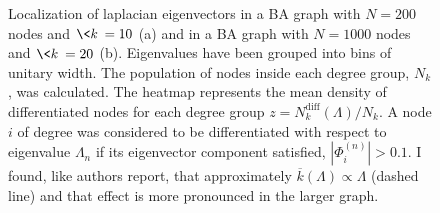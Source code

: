 \begin{figure}[H]
    \centering
{}
\caption{Localization of laplacian eigenvectors in a BA graph with $N=200$ nodes and $\<k\>=10$ (a) and in a BA graph with $N=1000$ nodes and $\<k\>=20$ (b). Eigenvalues have been grouped into bins of unitary width. The population of nodes inside each degree group, $N_k$, was calculated. The heatmap represents the mean density of differentiated nodes for each degree group $z = N_k^{\text{diff}}(\Lambda)/N_k$. A node $i$ of degree was considered to be differentiated with respect to eigenvalue $\Lambda_n$ if its eigenvector component satisfied, $|\Phi_i^{(n)}|> 0.1$. I found, like authors \cite{main_network} report, that approximately $\overline{k}(\Lambda) \propto \Lambda$ (dashed line) and that effect is more pronounced in the larger graph.}
\label{fig:heatmap}
\end{figure}

\nocite{bio_article}
\nocite{murray}
\nocite{altbook}
\newpage
